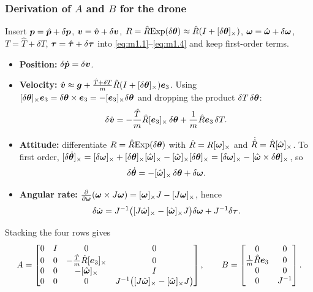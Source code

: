 \subsubsection*{Derivation of $A$ and $B$ for the drone}

Insert $\bm{p}=\hat{\bm p}+\delta\bm{p}$, $\bm{v}=\hat{\bm v}+\delta\bm{v}$, $R=\hat{R}\mathrm{Exp}(\delta\bm{\theta})\approx\hat{R}(I+[\delta\bm{\theta}]_{\times})$, $\bm{\omega}=\hat{\bm\omega}+\delta\bm{\omega}$,
$T=\hat T+\delta T$, $\bm{\tau}=\hat{\bm{\tau}}+\delta\bm{\tau}$ into \eqref{eq:m1.1}--\eqref{eq:m1.4} and keep first-order terms.

\begin{itemize}
\item \textbf{Position:} $\delta\dot{\bm{p}}=\delta\bm{v}$.
\item \textbf{Velocity:}
  $\dot{\bm{v}}\approx\bm{g}+\frac{\hat T+\delta T}{m}\hat{R}(I+[\delta\bm{\theta}]_{\times})\bm{e}_3$. Using
  $[\delta\bm{\theta}]_{\times}\bm{e}_3=\delta\bm{\theta}\times\bm{e}_3=-[\bm{e}_3]_{\times}\delta\bm{\theta}$ and dropping the product $\delta T\,\delta\bm{\theta}$:
  \[\delta\dot{\bm{v}}=-\frac{\hat T}{m}\hat{R}[\bm{e}_3]_{\times}\,\delta\bm{\theta}+\frac{1}{m}\hat{R}\bm{e}_3\,\delta T .\]
\item \textbf{Attitude:} differentiate $R=\hat{R}\mathrm{Exp}(\delta\bm{\theta})$ with $\dot R=R[\bm{\omega}]_{\times}$ and $\dot{\hat{R}}=\hat{R}[\hat{\bm\omega}]_{\times}$. To first order,
  $[\delta\dot{\bm{\theta}}]_{\times}=[\delta\bm{\omega}]_{\times}+[\delta\bm{\theta}]_{\times}[\hat{\bm\omega}]_{\times}-[\hat{\bm\omega}]_{\times}[\delta\bm{\theta}]_{\times}=[\delta\bm{\omega}]_{\times}-[\hat{\bm\omega}\times\delta\bm{\theta}]_{\times}$, so
  \[\delta\dot{\bm{\theta}}=-[\hat{\bm\omega}]_{\times}\,\delta\bm{\theta}+\delta\bm{\omega} .\]
\item \textbf{Angular rate:} $\frac{\partial}{\partial\bm{\omega}}(\bm{\omega}\times J\bm{\omega})=[\bm{\omega}]_{\times}J-[J\bm{\omega}]_{\times}$, hence
  \[\delta\dot{\bm{\omega}}=J^{-1}\big([J\hat{\bm\omega}]_{\times}-[\hat{\bm\omega}]_{\times}J\big)\delta\bm{\omega}+J^{-1}\delta\bm{\tau} .\]
\end{itemize}

Stacking the four rows gives
\begin{equation}
\label{eq:AB}
A=\begin{bmatrix}
0&I&0&0\\
0&0&-\frac{\hat T}{m}\hat{R}[\bm{e}_3]_{\times}&0\\
0&0&-[\hat{\bm\omega}]_{\times}&I\\
0&0&0&J^{-1}\big([J\hat{\bm\omega}]_{\times}-[\hat{\bm\omega}]_{\times}J\big)
\end{bmatrix},\qquad
B=\begin{bmatrix}0&0\\ \frac1m\hat{R}\bm{e}_3&0\\ 0&0\\ 0&J^{-1}\end{bmatrix}.
\end{equation}

